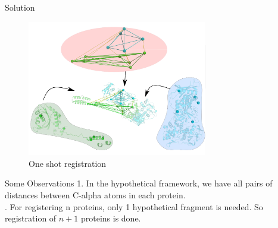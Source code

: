 \begin{frame}{Solution}
    \begin{figure}
        \centering
        \includegraphics[width=0.7\textwidth]{images/final.png}
        \caption{One shot registration}
        \label{fig:my_label}
    \end{figure}
\end{frame}

\begin{frame}{Some Observations}
    1. In the hypothetical framework, we have all pairs of distances between C-alpha atoms in each protein. \\
    . For registering n proteins, only 1 hypothetical fragment is needed. So registration of $n+1$ proteins is done. \\
\end{frame}